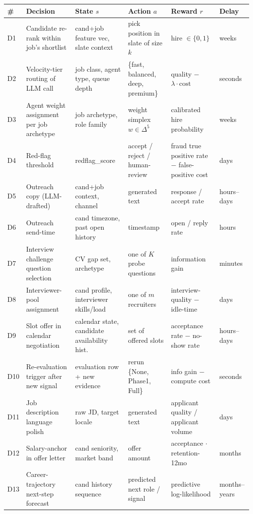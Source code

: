 \documentclass[11pt,oneside]{scrbook}
\begin{document}
\begin{longtable}{p{0.75cm} p{2.8cm} p{3.0cm} p{2.25cm} p{2.5cm} p{1.6cm}}
\toprule
\# & Decision & State $s$ & Action $a$ & Reward $r$ & Delay \\
\midrule
D1 & Candidate re-rank within job's shortlist & cand+job feature vec, slate context & pick position in slate of size $k$ & hire $\in \{0,1\}$ & weeks \\
D2 & Velocity-tier routing of LLM call & job class, agent type, queue depth & \{fast, balanced, deep, premium\} & quality $-$ $\lambda\cdot \text{cost}$ & seconds \\
D3 & Agent weight assignment per job archetype & job archetype, role family & weight simplex $w \in \Delta^5$ & calibrated hire probability & weeks \\
D4 & Red-flag threshold & redflag\_score & accept / reject / human-review & fraud true positive rate $-$ false-positive cost & days \\
D5 & Outreach copy (LLM-drafted) & cand+job context, channel & generated text & response / accept rate & hours--days \\
D6 & Outreach send-time & cand timezone, past open history & timestamp & open / reply rate & hours \\
D7 & Interview challenge question selection & CV gap set, archetype & one of $K$ probe questions & information gain & minutes \\
D8 & Interviewer-pool assignment & cand profile, interviewer skills/load & one of $m$ recruiters & interview-quality $-$ idle-time & days \\
D9 & Slot offer in calendar negotiation & calendar state, candidate availability hist. & set of offered slots & acceptance rate $-$ no-show rate & hours--days \\
D10 & Re-evaluation trigger after new signal & evaluation row + new evidence & rerun \{None, Phase1, Full\} & info gain $-$ compute cost & seconds \\
D11 & Job description language polish & raw JD, target locale & generated text & applicant quality / applicant volume & days \\
D12 & Salary-anchor in offer letter & cand seniority, market band & offer amount & acceptance $\cdot$ retention-12mo & months \\
D13 & Career-trajectory next-step forecast & cand history sequence & predicted next role / signal & predictive log-likelihood & months--years \\
\bottomrule
\end{longtable}
\end{document}
